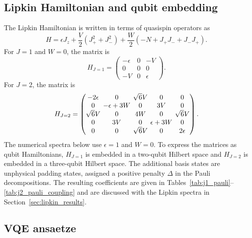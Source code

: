 \documentclass[10pt,a4paper]{article}
\begin{document}
\subsection{Lipkin Hamiltonian and qubit embedding}

The Lipkin Hamiltonian is written in terms of quasispin operators as
\begin{equation}
H=\epsilon J_z+\frac{V}{2}(J_+^2+J_-^2)+\frac{W}{2}(-N+J_+J_-+J_-J_+).
\label{eq:lipkin_operator}
\end{equation}
For $J=1$ and $W=0$, the matrix is
\begin{equation}
H_{J=1}=\begin{pmatrix} -\epsilon & 0 & -V\\ 0&0&0\\ -V&0&\epsilon \end{pmatrix}.
\label{eq:j1_matrix}
\end{equation}
For $J=2$, the matrix is
\begin{equation}
\begingroup\setlength{\arraycolsep}{2.0pt}
H_{J=2}=\begin{pmatrix}
-2\epsilon & 0 & \sqrt{6}V & 0 & 0\\
0 & -\epsilon+3W & 0 & 3V & 0\\
\sqrt{6}V & 0 & 4W & 0 & \sqrt{6}V\\
0 & 3V & 0 & \epsilon+3W & 0\\
0 & 0 & \sqrt{6}V & 0 & 2\epsilon
\end{pmatrix}.
\endgroup
\label{eq:j2_matrix}
\end{equation}
The numerical spectra below use $\epsilon=1$ and $W=0$. To express the matrices as qubit Hamiltonians, $H_{J=1}$ is embedded in a two-qubit Hilbert space and $H_{J=2}$ is embedded in a three-qubit Hilbert space. The additional basis states are unphysical padding states, assigned a positive penalty $\Delta$ in the Pauli decompositions. The resulting coefficients are given in Tables~\ref{tab:j1_pauli}--\ref{tab:j2_pauli_coupling} and are discussed with the Lipkin spectra in Section~\ref{sec:lipkin_results}.

\subsection{VQE ansaetze}
\end{document}
